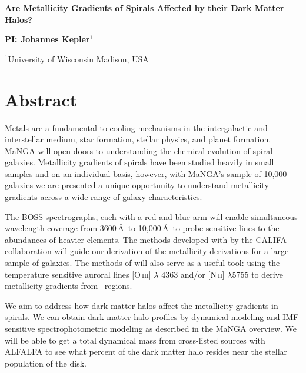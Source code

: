 \documentclass[11pt, a4paper, onecolumn]{article}
\begin{document}
\pagestyle{plain}
 

\begin{center}
{\LARGE{\bf
{Are Metallicity Gradients of Spirals Affected by their Dark Matter Halos?}
}}
\end{center}
\bigskip

\centerline{\bf PI:\@
{Johannes Kepler}$^1$}

\smallskip
$^1$University of Wisconsin Madison, USA
\smallskip


\section{Abstract}\label{sec:abstract}

    Metals are a fundamental to cooling mechanisms in the intergalactic and
    interstellar medium, star formation, stellar physics, and planet
    formation.  MaNGA will open doors to understanding the chemical evolution
    of spiral galaxies. Metallicity gradients of spirals have been studied
    heavily in small samples and on an individual basis, however, with MaNGA's
    sample of 10,000 galaxies we are presented a unique opportunity to
    understand metallicity gradients across a wide range of galaxy
    characteristics.

    The BOSS spectrographs, each with a red and blue arm will enable
    simultaneous wavelength coverage from 3600\,\AA\ to 10,000\,\AA\ to probe
    sensitive lines to the abundances of heavier elements. The methods
    developed with by the CALIFA collaboration \citep{sanchez12} will guide our
    derivation of the metallicity derivations for a large sample of galaxies.
    The methods of \citet{berg13} will also serve as a useful tool: using the
    temperature sensitive auroral lines [O\,\textsc{iii}] $\lambda$ 4363 and/or
    [N\,\textsc{ii}] $\lambda$5755 to derive metallicity gradients from \hii\
    regions.

    We aim to address how dark matter halos affect the metallicity gradients in
    spirals. We can obtain dark matter halo profiles by dynamical modeling
    \citep[e.g.,][]{cappellari06} and IMF-sensitive spectrophotometric modeling
    \citep{conroy12} as described in the MaNGA overview. We will be able to get
    a total dynamical mass from cross-listed sources with ALFALFA
    \citep{haynes11} to see what percent of the dark matter halo resides near
    the stellar population of the disk.
    
\end{document}
